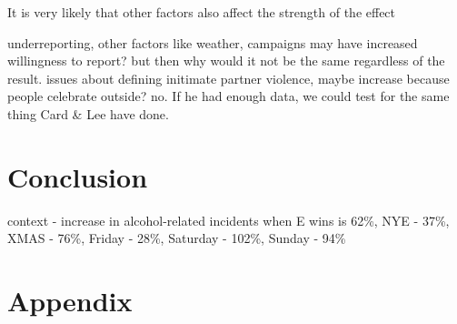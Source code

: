 \documentclass[12pt, letterpaper]{article}
\begin{document}
It is very likely that other factors also affect the strength of the effect

underreporting, other factors like weather, campaigns may have increased willingness to report? but then why would it not be the same regardless of the result. issues about defining initimate partner violence, maybe increase because people celebrate outside? no.
If he had enough data, we could test for the same thing Card \& Lee have done.


\section{Conclusion}

context - increase in alcohol-related incidents when E wins is 62\%, NYE - 37\%, XMAS - 76\%, Friday - 28\%, Saturday - 102\%, Sunday - 94\%



\newpage

\section{Appendix}
\end{document}
